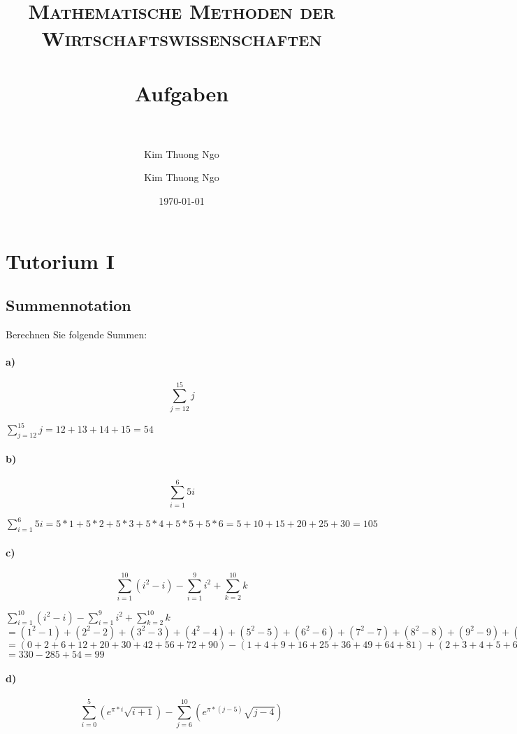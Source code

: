\documentclass[paper=a4, fontsize=11pt]{scrartcl}
\author{Kim Thuong Ngo}
\title{
\normalfont \normalsize
\textsc{Mathematische Methoden der Wirtschaftswissenschaften} \\ [25pt]
\horrule{0.5pt} \\[0.4cm]
\huge Aufgaben \\
\horrule{2pt} \\[0.5cm]
}
\author{Kim Thuong Ngo}
\date{\normalsize\today}
\numberwithin{equation}{section}
\numberwithin{figure}{section}
\numberwithin{table}{section}
\begin{document}
\maketitle

\newpage

\tableofcontents

\newpage
\section{Tutorium I}
\subsection{Summennotation}
Berechnen Sie folgende Summen:
\paragraph{a)}
$$\sum^{15}_{j=12}j$$

$\sum^{15}_{j=12}j = 12+13+14+15 = 54$

\paragraph{b)}
$$\sum^{6}_{i=1}5i$$

$\sum^{6}_{i=1}5i = 5*1+5*2+5*3+5*4+5*5+5*6 = 5+10+15+20+25+30 = 105$

\paragraph{c)}
$$\sum^{10}_{i=1}(i^{2}-i)-\sum^{9}_{i=1}i^{2}+\sum^{10}_{k=2}k$$

$\sum^{10}_{i=1}(i^{2}-i)-\sum^{9}_{i=1}i^{2}+\sum^{10}_{k=2}k $ \\
$= (1^{2}-1)+(2^{2}-2)+(3^{2}-3)+(4^{2}-4)+(5^{2}-5)
+(6^{2}-6)+(7^{2}-7)+(8^{2}-8)+(9^{2}-9)
+(10^{2}-10)
-(1^{2}+2^{2}+3^{2}+4^{2}+5^{2}+6^{2}
+7^{2}+8^{2}+9^{2})
+(2+3+4+5+6+7+8+9+10)$ \\
$=
(0+2+6+12+20+30+42+56+72+90)
-(1+4+9+16+25+36+49+64+81)
+(2+3+4+5+6+7+8+9+10)$ \\
$=
330-285+54 = 99$

\paragraph{d)}
$$\sum^{5}_{i=0}(e^{\pi *i} \sqrt{i+1})-\sum^{10}_{j=6}(e^{\pi *(j-5)} \sqrt{j-4})$$
\end{document}
